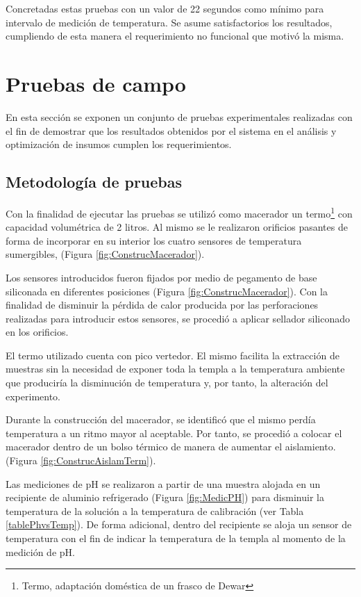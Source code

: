 \par
Concretadas estas pruebas con un valor de 22 segundos como mínimo para intervalo de medición de temperatura. Se asume satisfactorios los resultados, cumpliendo de esta manera el requerimiento no funcional que motivó la misma.


\section{Pruebas de campo}
\par En esta sección se exponen un conjunto de pruebas experimentales realizadas con el fin de demostrar que los resultados obtenidos por el sistema en el análisis y optimización de insumos cumplen los requerimientos. 

    \subsection{Metodología de pruebas}
        \par Con la finalidad de ejecutar las pruebas se utilizó como macerador un termo\footnote{Termo, adaptación doméstica de un frasco de Dewar} con capacidad volumétrica de 2 litros. Al mismo se le realizaron orificios pasantes de forma de incorporar en su interior los cuatro sensores de temperatura sumergibles, (Figura \ref{fig:ConstrucMacerador}).
        
        \par Los sensores introducidos fueron fijados por medio de pegamento de base siliconada en diferentes posiciones (Figura \ref{fig:ConstrucMacerador}). Con la finalidad de disminuir la pérdida de calor producida por las perforaciones realizadas para introducir estos sensores, se procedió a aplicar sellador siliconado  en los orificios.
        
        \par El termo utilizado cuenta con pico vertedor. El mismo facilita la extracción de muestras sin la necesidad de exponer toda la templa a la temperatura ambiente que produciría la disminución de temperatura y, por tanto, la alteración del experimento.
        
        \par Durante la construcción del macerador, se identificó que el mismo perdía temperatura a un ritmo mayor al aceptable. Por tanto, se procedió a colocar el macerador dentro de un bolso térmico de manera de aumentar el aislamiento. (Figura \ref{fig:ConstrucAislamTerm}).
        
        \par Las mediciones de pH se realizaron a partir de una muestra alojada en un recipiente de aluminio refrigerado (Figura \ref{fig:MedicPH}) para disminuir la temperatura de la solución a la temperatura de calibración (ver Tabla \ref{tablePhvsTemp}). De forma adicional, dentro del recipiente se aloja un sensor de temperatura con el fin de indicar la temperatura de la templa al momento de la medición de pH.
        
